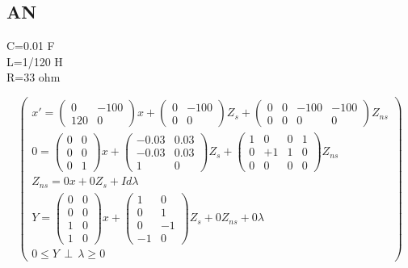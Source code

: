 \subsection{AN}
C=0.01 F\\
L=1/120 H\\
R=33 ohm

\[
\left(\begin{array}{c}
  
x'=\left(\begin{array}{cc}
0 &-100\\
120&0\end{array} \right)x
+\left(\begin{array}{cc}
0&-100\\
0&0\end{array} \right)Z_{s}
+\left(\begin{array}{cccc}
0&0&-100&-100\\
0&0&0&0\end{array} \right)Z_{ns}
\\
0=\left(\begin{array}{cc}
0 &0\\
0 &0\\
0 &1\end{array} \right)x
+\left(\begin{array}{cc}
-0.03&0.03\\
-0.03&0.03\\
1 &0\end{array} \right)Z_{s}
+\left(\begin{array}{cccc}
1&0&0&1\\
0&+1&1&0\\
0&0&0&0\end{array} \right)Z_{ns}
\\
Z_{ns}=0x+0Z_{s}+Id\lambda\\
Y=\left(\begin{array}{cc}
0&0\\
0&0\\
1&0\\
1&0\end{array}\right) x+
\left(\begin{array}{cc}
1&0\\
0&1\\
0&-1\\
-1&0\end{array}
\right) Z_{s} + 0Z_{ns} +0\lambda\\

0 \leq Y \, \perp \, \lambda \geq 0

\end{array}
\right)
\]
